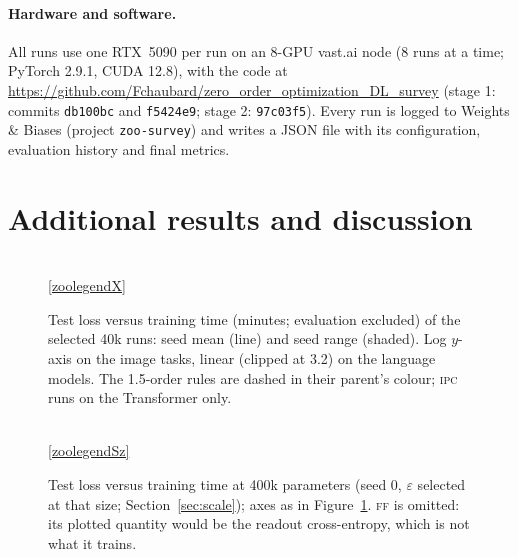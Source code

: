 \documentclass{article}
\newcommand{\method}[1]{\textsc{#1}}
\newcommand{\FF}{\method{ff}}
\newcommand{\IPC}{\method{ipc}}
\begin{document}
\paragraph{Hardware and software.}
All runs use one RTX~5090 per run on an 8-GPU vast.ai node (8 runs at a time; PyTorch
2.9.1, CUDA 12.8), with the code at
\url{https://github.com/Fchaubard/zero_order_optimization_DL_survey} (stage 1: commits
\texttt{db100bc} and \texttt{f5424e9}; stage 2: \texttt{97c03f5}). Every run is logged to
Weights \& Biases (project \texttt{zoo-survey}) and writes a JSON file with its
configuration, evaluation history and final metrics.

\section{Additional results and discussion}
\label{app:extra}

\begin{table}[ht]
  \caption{The 1.5-order rules under their own recipe (plain SGD, fp64 losses,
  30-minute screening): the best configuration by validation loss and its
  best-checkpoint test loss (accuracy or bits per character), the $\alpha=0$ control
  at the same grid, and the protocol run (Adam, tied $\varepsilon$) at minute 30. Config
  key: lr $=\eta$; K17 / K129 $=$ 8 / 64 antithetic pairs per step; sig $=\sigma$; lam $=\lambda$;
  l64 $=$ fp64 losses.}
  \label{tab:own}
  \centering
  \scriptsize
  \setlength{\tabcolsep}{3pt}
  \resizebox{\linewidth}{!}{}
\end{table}

\begin{figure}[ht]
  \centering
  
  \\[0.5ex]
  \ref{zoolegendX}
  \caption{Test loss versus training time (minutes; evaluation excluded) of the selected
  40k runs: seed mean (line) and seed range (shaded). Log $y$-axis on the image tasks, linear
  (clipped at 3.2) on the language models. The 1.5-order rules are dashed in their parent's colour; \IPC{} runs on the Transformer only.}
  \label{fig:curves}
\end{figure}

\begin{figure}[ht]
  \centering
  
  \\[0.5ex]
  \ref{zoolegendSz}
  \caption{Test loss versus training time at 400k parameters (seed 0, $\varepsilon$
  selected at that size; Section~\ref{sec:scale}); axes as in Figure~\ref{fig:curves}. \FF{} is omitted: its plotted
  quantity would be the readout cross-entropy, which is not what it trains.}
  \label{fig:curves400k}
\end{figure}
\end{document}
